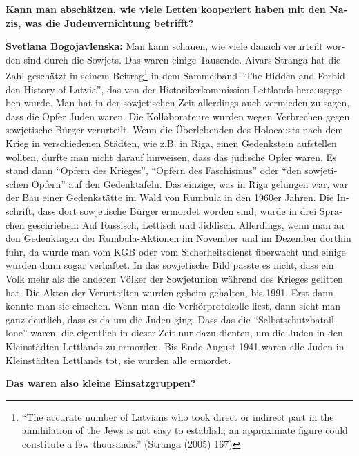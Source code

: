 \begin{otherlanguage}{ngerman}
\textbf{Kann man abschätzen, wie viele Letten kooperiert haben mit den Nazis, was die Judenvernichtung betrifft?}

\textbf{Svetlana Bogojavlenska:} Man kann schauen, wie viele danach verurteilt worden sind durch die Sowjets. Das waren einige Tausende. Aivars Stranga hat die Zahl geschätzt in seinem Beitrag\footnote{``The accurate number of Latvians who took direct or indirect part in the annihilation of the Jews is not easy to establish; an approximate figure could constitute a few thousands.'' (Stranga (2005) 167) } in dem Sammelband "`The Hidden and Forbidden History of Latvia"', das von der Historikerkommission Lettlands herausgegeben wurde. Man hat in der sowjetischen Zeit allerdings auch vermieden zu sagen, dass die Opfer Juden waren. Die Kollaborateure wurden wegen Verbrechen gegen sowjetische Bürger verurteilt. Wenn die Überlebenden des Holocausts nach dem Krieg in verschiedenen Städten, wie z.B. in Riga, einen Gedenkstein aufstellen wollten, durfte man nicht darauf hinweisen, dass das jüdische Opfer waren. Es stand dann "`Opfern des Krieges"', "`Opfern des Faschismus"' oder "`den sowjetischen Opfern"' auf den Gedenktafeln. Das einzige, was in Riga gelungen war, war der Bau einer Gedenkstätte im Wald von Rumbula in den 1960er Jahren. Die Inschrift, dass dort sowjetische Bürger ermordet worden sind, wurde in drei Sprachen geschrieben: Auf Russisch, Lettisch und Jiddisch. Allerdings, wenn man an den Gedenktagen der Rumbula-Aktionen im November und im Dezember dorthin fuhr, da wurde man vom KGB oder vom Sicherheitsdienst überwacht und einige wurden dann sogar verhaftet. In das sowjetische Bild passte es nicht, dass ein Volk mehr als die anderen Völker der Sowjetunion während des Krieges gelitten hat. Die Akten der Verurteilten wurden geheim gehalten, bis 1991. Erst dann konnte man sie einsehen. Wenn man die Verhörprotokolle liest, dann sieht man ganz deutlich, dass es da um die Juden ging. Dass das die "`Selbstschutzbataillone"' waren, die eigentlich in dieser Zeit nur dazu dienten, um die Juden in den Kleinstädten Lettlands zu ermorden. Bis Ende August 1941 waren alle Juden in Kleinstädten Lettlands tot, sie wurden alle ermordet.
 
\textbf{Das waren also kleine Einsatzgruppen?}


\end{otherlanguage}
